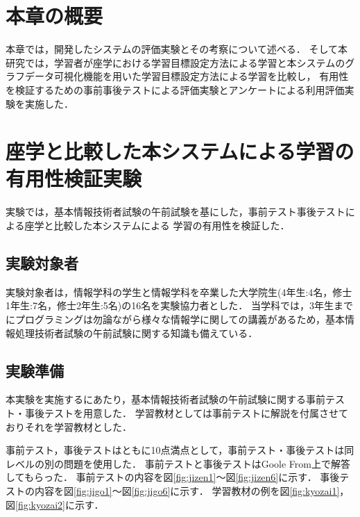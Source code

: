 \section{本章の概要}
本章では，開発したシステムの評価実験とその考察について述べる．
そして本研究では，学習者が座学における学習目標設定方法による学習と本システムのグラフデータ可視化機能を用いた学習目標設定方法による学習を比較し，
有用性を検証するための事前事後テストによる評価実験とアンケートによる利用評価実験を実施した．

\section{座学と比較した本システムによる学習の有用性検証実験}
実験では，基本情報技術者試験の午前試験\cite{gozen}を基にした，事前テスト事後テストによる座学と比較した本システムによる
学習の有用性を検証した．

\subsection{実験対象者}
実験対象者は，情報学科の学生と情報学科を卒業した大学院生(4年生:4名，修士1年生:7名，修士2年生:5名)の16名を実験協力者とした．
当学科では，3年生までにプログラミングは勿論ながら様々な情報学に関しての講義があるため，基本情報処理技術者試験の午前試験に関する知識も備えている．

\subsection{実験準備}
本実験を実施するにあたり，基本情報技術者試験の午前試験に関する事前テスト・事後テストを用意した．
学習教材としては事前テストに解説を付属させておりそれを学習教材とした．

事前テスト，事後テストはともに10点満点として，事前テスト・事後テストは同レベルの別の問題を使用した．
事前テストと事後テストはGoole From上で解答してもらった．
事前テストの内容を図\ref{fig:jizen1}～図\ref{fig:jizen6}に示す．
事後テストの内容を図\ref{fig:jigo1}～図\ref{fig:jigo6}に示す．
学習教材の例を図\ref{fig:kyozai1}，図\ref{fig:kyozai2}に示す．

